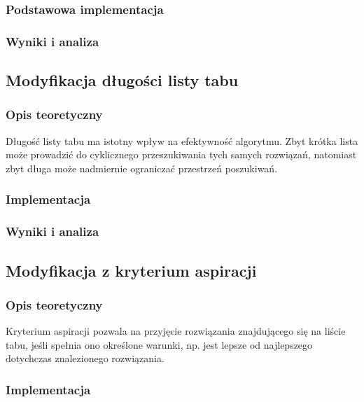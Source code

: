 \documentclass[12pt,a4paper]{article}
\begin{document}
\subsubsection{Podstawowa implementacja}

\subsubsection{Wyniki i analiza}

\subsection{Modyfikacja długości listy tabu}
\subsubsection{Opis teoretyczny}
Długość listy tabu ma istotny wpływ na efektywność algorytmu. Zbyt krótka lista może prowadzić do cyklicznego przeszukiwania tych samych rozwiązań, natomiast zbyt długa może nadmiernie ograniczać przestrzeń poszukiwań.

\subsubsection{Implementacja}

\subsubsection{Wyniki i analiza}

\subsection{Modyfikacja z kryterium aspiracji}
\subsubsection{Opis teoretyczny}
Kryterium aspiracji pozwala na przyjęcie rozwiązania znajdującego się na liście tabu, jeśli spełnia ono określone warunki, np. jest lepsze od najlepszego dotychczas znalezionego rozwiązania.

\subsubsection{Implementacja}
\end{document}
